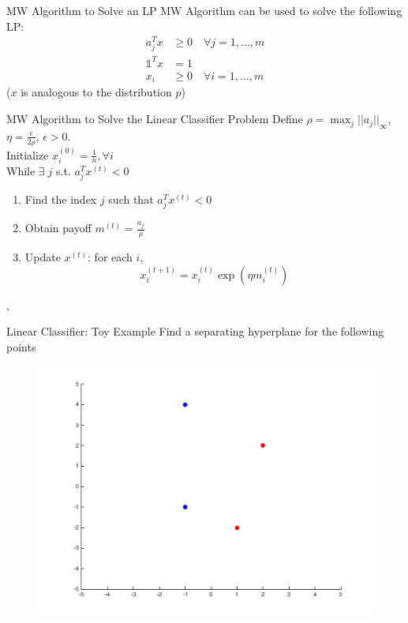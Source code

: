 \documentclass{beamer}
\begin{document}
\begin{frame}{MW Algorithm to Solve an LP}
MW Algorithm can be used to solve the following LP:
\begin{align*}
a_j^Tx &\geq 0 \quad \forall j = 1,\ldots,m \\
\mathds{1}^Tx &= 1 \\
x_i &\geq 0 \quad \forall i = 1,\ldots,m
\end{align*}
($x$ is analogous to the distribution $p$)\\
\end{frame}

\begin{frame}{MW Algorithm to Solve the Linear Classifier Problem}
Define $\rho = \max_j ||a_j||_\infty$, $\eta = \frac{\epsilon}{2\rho}$, $\epsilon > 0$. \\ \vspace{.5cm}
Initialize $x_i^{(0)} = \frac{1}{n}, \forall i$\\ \vspace{.5cm}
While $\exists \; j$ s.t. $a_j^T x^{(t)} < 0$
\begin{enumerate}
\setlength\itemsep{1.2em}
\item Find the index $j$ such that $a_j^Tx^{(t)} <0$
\item Obtain payoff $m^{(t)} = \frac{a_j}{\rho}$
\item Update $x^{(t)}$: for each $i$,
$$ x_i^{(t+1)} = x_i^{(t)}\exp(\eta m_i^{(t)})$$
\end{enumerate}
,\end{frame}

\begin{frame}{Linear Classifier: Toy Example}
Find a separating hyperplane for the following points
\begin{figure}
\includegraphics[width=\textwidth]{ClassifierToy_scatter.png}
\end{figure}
\end{frame}
\end{document}
